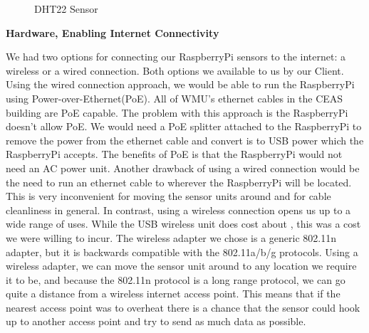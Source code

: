 \documentclass{report}
\begin{document}
\begin{figure}[H]
	\caption{DHT22 Sensor}
\end{figure}
\newpage

\begin{center}
	\textbf{Hardware, Enabling Internet Connectivity}
\end{center}
\indent
\indent
We had two options for connecting our RaspberryPi sensors to the internet: a wireless or a wired connection. Both options we available to us by our Client.
\newline
\indent
Using the wired connection approach, we would be able to run the RaspberryPi using Power-over-Ethernet(PoE). All of WMU's ethernet cables in the CEAS building are PoE capable. The problem with this approach is the RaspberryPi doesn't allow PoE. We would need a PoE splitter attached to the RaspberryPi to remove the power from the ethernet cable and convert is to USB power which the RaspberryPi accepts. The benefits of PoE is that the RaspberryPi would not need an AC power unit.
\newline
\indent
Another drawback of using a wired connection would be the need to run an ethernet cable to wherever the RaspberryPi will be located. This is very inconvenient for moving the sensor units around and for cable cleanliness in general.
\newline
\indent
In contrast, using a wireless connection opens us up to a wide range of uses. While the USB wireless unit does cost about , this was a cost we were willing to incur. The wireless adapter we chose is a generic 802.11n adapter, but it is backwards compatible with the 802.11a/b/g protocols. Using a wireless adapter, we can move the sensor unit around to any location we require it to be, and because the 802.11n protocol is a long range protocol, we can go quite a distance from a wireless internet access point. This means that if the nearest access point was to overheat there is a chance that the sensor could hook up to another access point and try to send as much data as possible.
\newpage
\end{document}
